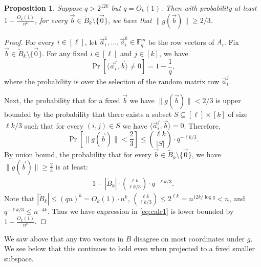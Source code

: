 \documentclass[11pt]{article}
\newcommand{\F}{\mathbb{F}}
\renewcommand{\ge}{ \geqslant}
\renewcommand{\le}{ \leqslant}
\newtheorem{proposition}[theorem]{Proposition}
\renewcommand{\tilde}{\widetilde}
\begin{document}
 \begin{proposition}\label{prop:collision}
Suppose $q>2^{12k}$ but $q=O_k(1)$. Then with probability at least $1-\frac{O_k(1)}{n^{k}}$,   for every  $\vec{b}\in \tilde{B}_k\setminus\{\vec{0}\}$, we have that  $\|g(\vec{b})\|\ge 2/3$. 
\end{proposition}  
\begin{proof}
For every $i\in[\ell]$, let $\vec{a}_i^1,\ldots ,\vec{a}_i^k\in\F_q^m$ be the row vectors of  $A_i$.
Fix $\vec{b}\in \tilde{B}_k\setminus\{\vec{0}\}$. 
For any fixed $i\in[\ell]$ and $j\in[k]$, we have $$
\Pr\left[\langle \vec{a}_i^j, \vec{b}\rangle\neq 0\right]=1-\frac{1}{q},
$$
where the probability is over the selection of the random matrix row $\vec{a}_i^j$. 

Next, the probability that for a fixed $\vec{b}$ we have $\|g(\vec{b})\|< 2/3$ is upper bounded by the probability that there exists a subset  $S\subseteq [\ell]\times [k]$ of size    $\ell k/3$ such  that for every $(i,j)\in S$ we have $\langle \vec{a}_i^j, \vec{b}\rangle= 0$. Therefore, 
$$\Pr\left[\|g(\vec{b})\|< \frac{2}{3}\right]\le \binom{\ell k}{|S|}\cdot q^{-\ell k/3}.$$
By union bound, the probability that for every  $\vec{b}\in \tilde{B}_k\setminus\{\vec{0}\}$, we have  $\|g(\vec{b})\|\ge\frac{2}{3}$ is at least:
\begin{align}
 1-|\tilde{B}_k|\cdot\binom{\ell k}{\ell k/3}\cdot q^{-\ell k/3}.\label{eq:calc1}
\end{align}
Note that $|\tilde{B}_k|\le (qn)^k=O_k(1)\cdot n^k$, $\binom{\ell k}{\ell k/3}\le 2^{\ell k}=n^{12k/\log q}< n$, and $q^{-\ell k/3}\le n^{-4k}$. Thus we have expression in \eqref{eq:calc1} is lower bounded by $1-\frac{O_k(1)}{n^{k}}$. 
\end{proof}

We saw above that any two vectors in $B$ disagree on most coordinates under $g$. We see below that this continues to hold even when projected to a fixed smaller subspace. 
   
\end{document}
